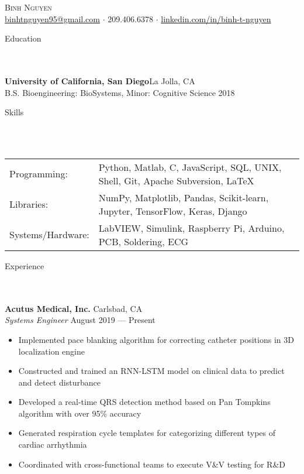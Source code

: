 \documentclass{article}
\newcommand{\lineunder} {
    \vspace*{-8pt} \\
    \hspace*{-18pt} \hrulefill \\
}
\newcommand{\header} [1] {
    {\hspace*{-18pt}\vspace*{6pt} \Large{#1} }
    \vspace*{-6pt} 
    \lineunder
}
\begin{document}
\vspace*{-40pt}

  

\begin{center}
	{\Huge \scshape {Binh Nguyen}}\\
	\vspace{2mm}
	\href{mailto:binhtnguyen95@gmail.com}{binhtnguyen95@gmail.com} $\cdot$ 
	209.406.6378 $\cdot$ 
	\href{https://www.linkedin.com/in/binh-t-nguyen}{linkedin.com/in/binh-t-nguyen} 
\end{center}

\header{Education}
\textbf{University of California, San Diego}\hfill La Jolla, CA\\
B.S. Bioengineering: BioSystems, Minor: Cognitive Science \hfill 2018\\
\vspace{7mm}

\header{Skills}
\vspace{1mm}
\begin{tabular}{ l l }
	Programming: & Python, Matlab, C, JavaScript, SQL, UNIX, Shell, Git, Apache Subversion, \LaTeX \\
	Libraries:   & NumPy, Matplotlib, Pandas, Scikit-learn, Jupyter, TensorFlow, Keras, Django \\
	Systems/Hardware:    & LabVIEW, Simulink, Raspberry Pi, Arduino, PCB, Soldering, ECG \\
\end{tabular}
\vspace{5mm}

\header{Experience}

\textbf{Acutus Medical, Inc.} \hfill Carlsbad, CA\\
\textit{Systems Engineer} \hfill August 2019 --- Present\\
\vspace{-2mm}
\begin{itemize} \itemsep 0.05pt
	\item Implemented pace blanking algorithm for correcting catheter positions in 3D localization engine
	\item Constructed and trained an RNN-LSTM model on clinical data to predict and detect disturbance
	\item Developed a real-time QRS detection method based on Pan Tompkins algorithm with over 95\% accuracy
	\item Generated respiration cycle templates for categorizing different types of cardiac arrhythmia
	\item Coordinated with cross-functional teams to execute V\&V testing for R\&D
\end{itemize}
\end{document}
